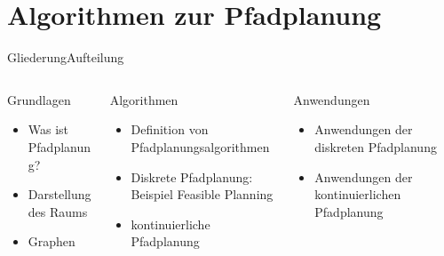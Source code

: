 \documentclass[t,aspectratio=169,dvipsnames]{beamer}
\begin{document}
\section{Algorithmen zur Pfadplanung}
	\begin{frame}{Gliederung}{Aufteilung}
	\begin{columns}[T]
		\begin{column}[T]{0.33\textwidth}
			\begin{block}{Grundlagen}
				\begin{itemize}
					\item Was ist Pfadplanung?
					\item Darstellung des Raums
					\item Graphen
					\newline\newline\newline
				\end{itemize}
			\end{block}
		\end{column}
		\begin{column}[T]{0.33\textwidth}
			\begin{alertblock}{Algorithmen}
				\begin{itemize}
					\item Definition von Pfadplanungsalgorithmen
					\item Diskrete Pfadplanung: Beispiel Feasible Planning
					\item kontinuierliche Pfadplanung
				\end{itemize}
			\end{alertblock}
		\end{column}
		\begin{column}[T]{0.33\textwidth}
			\begin{block}{Anwendungen}
				\begin{itemize}
					\item Anwendungen der diskreten Pfadplanung
					\item Anwendungen der kontinuierlichen Pfadplanung
					\newline\newline
				\end{itemize}		
			\end{block}
		\end{column}
	\end{columns}	
\end{frame}
\end{document}
